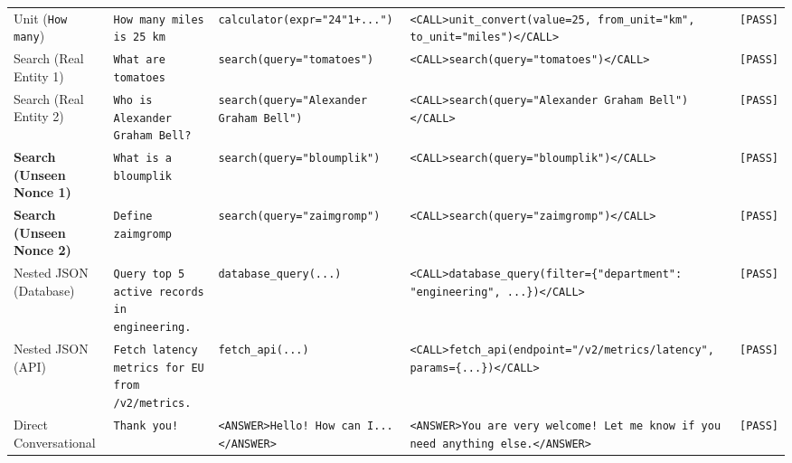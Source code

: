 \documentclass[10pt,twocolumn]{article}
\begin{document}
\begin{table}[t]
{\begin{tabular}{@{}lllll@{}}
Unit (\texttt{How many}) & \texttt{How many miles is 25 km} & \texttt{calculator(expr="24"1+...")} & \texttt{<CALL>unit\_convert(value=25, from\_unit="km", to\_unit="miles")</CALL>} & \texttt{[PASS]} \\
Search (Real Entity 1) & \texttt{What are tomatoes} & \texttt{search(query="tomatoes")} & \texttt{<CALL>search(query="tomatoes")</CALL>} & \texttt{[PASS]} \\
Search (Real Entity 2) & \texttt{Who is Alexander Graham Bell?} & \texttt{search(query="Alexander Graham Bell")} & \texttt{<CALL>search(query="Alexander Graham Bell")</CALL>} & \texttt{[PASS]} \\
\textbf{Search (Unseen Nonce 1)} & \texttt{What is a bloumplik} & \texttt{search(query="bloumplik")} & \texttt{<CALL>search(query="bloumplik")</CALL>} & \texttt{[PASS]} \\
\textbf{Search (Unseen Nonce 2)} & \texttt{Define zaimgromp} & \texttt{search(query="zaimgromp")} & \texttt{<CALL>search(query="zaimgromp")</CALL>} & \texttt{[PASS]} \\
Nested JSON (Database) & \texttt{Query top 5 active records in engineering.} & \texttt{database\_query(...)} & \texttt{<CALL>database\_query(filter=\{"department": "engineering", ...\})</CALL>} & \texttt{[PASS]} \\
Nested JSON (API) & \texttt{Fetch latency metrics for EU from /v2/metrics.} & \texttt{fetch\_api(...)} & \texttt{<CALL>fetch\_api(endpoint="/v2/metrics/latency", params=\{...\})</CALL>} & \texttt{[PASS]} \\
Direct Conversational & \texttt{Thank you!} & \texttt{<ANSWER>Hello! How can I...</ANSWER>} & \texttt{<ANSWER>You are very welcome! Let me know if you need anything else.</ANSWER>} & \texttt{[PASS]} \\
\bottomrule
\end{tabular}%
}
\end{table}
\end{document}
